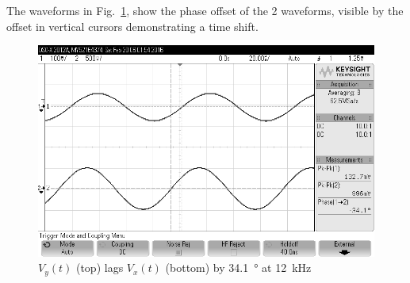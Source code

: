 The waveforms in Fig.~\ref{fig:scope}, show the phase offset of the 2 waveforms, visible by the offset in vertical cursors demonstrating a time shift.

\begin{figure}[tbph]
	\centering
	\includegraphics[width=0.65\linewidth]{graphics/12khz_phase_lag}
	\caption{$V_y(t)$ (top) lags $V_x(t)$ (bottom) by \SI{34.1}{\degree} at \SI{12}{\kilo\hertz}}
	\label{fig:scope}
\end{figure}

\clearpage
